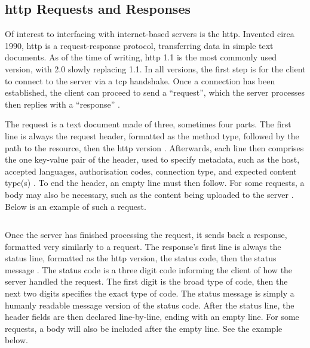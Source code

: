 \documentclass[11pt]{article}
\begin{document}
\subsection{\acrshort{http} Requests and Responses}    \label{sec:http}

Of interest to interfacing with internet-based \gls{server}s is the \acrfull{http}. Invented circa 1990, \acrshort{http} is a \gls{request}-\gls{response} protocol, transferring data in simple text documents. As of the time of writing, \acrshort{http} 1.1 is the most commonly used version, with 2.0 slowly replacing 1.1. In all versions, the first step is for the \gls{client} to connect to the \gls{server} via a \acrshort{tcp} handshake. Once a connection has been established, the \gls{client} can proceed to send a ``\gls{request}'', which the \gls{server} processes then replies with a ``\gls{response}'' \cite{http-message}.

The \gls{request} is a text document made of three, sometimes four parts. The first line is always the \gls{request} header, formatted as the method type, followed by the path to the resource, then the \acrshort{http} version \cite{http-message}. Afterwards, each line then comprises the one key-value pair of the header, used to specify \gls{metadata}, such as the host, accepted languages, authorisation codes, connection type, and expected content type(s) \cite{http-message}. To end the header, an empty line must then follow. For some \glspl{request}, a body may also be necessary, such as the content being uploaded to the \gls{server} \cite{http-message}. Below is an example of such a \gls{request}.

\vspace{0.5\baselineskip}

\inputminted[linenos=true]{html}{http_examples/post_request.html}

Once the \gls{server} has finished processing the \gls{request}, it sends back a \gls{response}, formatted very similarly to a \gls{request}. The \gls{response}'s first line is always the status line, formatted as the \acrshort{http} version, the status code, then the status message \cite{http-response}. The status code is a three digit code informing the \gls{client} of how the \gls{server} handled the \gls{request}. The first digit is the broad type of code, then the next two digits specifies the exact type of code. The status message is simply a humanly readable message version of the status code. After the status line, the header fields are then declared line-by-line, ending with an empty line. For some \gls{request}s, a body will also be included after the empty line. See the example below.
\end{document}
